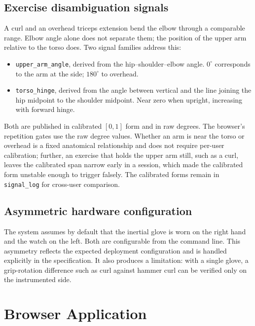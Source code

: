 \documentclass[11pt,a4paper]{article}
\newcommand{\code}[1]{\texttt{\small #1}}
\begin{document}
\subsection{Exercise disambiguation signals}

A curl and an overhead triceps extension bend the elbow through a comparable
range. Elbow angle alone does not separate them; the position of the upper arm
relative to the torso does. Two signal families address this:

\begin{itemize}
\item \code{upper\_arm\_angle}, derived from the hip--shoulder--elbow angle.
      $0^\circ$ corresponds to the arm at the side; $180^\circ$ to overhead.
\item \code{torso\_hinge}, derived from the angle between vertical and the line
      joining the hip midpoint to the shoulder midpoint. Near zero when upright,
      increasing with forward hinge.
\end{itemize}

Both are published in calibrated $[0,1]$ form and in raw degrees. The browser's
repetition gates use the raw degree values. Whether an arm is near the torso or
overhead is a fixed anatomical relationship and does not require per-user
calibration; further, an exercise that holds the upper arm still, such as a curl,
leaves the calibrated span narrow early in a session, which made the calibrated
form unstable enough to trigger falsely. The calibrated forms remain in
\code{signal\_log} for cross-user comparison.

\subsection{Asymmetric hardware configuration}

The system assumes by default that the inertial glove is worn on the right hand
and the watch on the left. Both are configurable from the command line. This
asymmetry reflects the expected deployment configuration and is handled
explicitly in the specification. It also produces a limitation: with a single
glove, a grip-rotation difference such as curl against hammer curl can be
verified only on the instrumented side.

\section{Browser Application}
\label{sec:browser}
\end{document}
